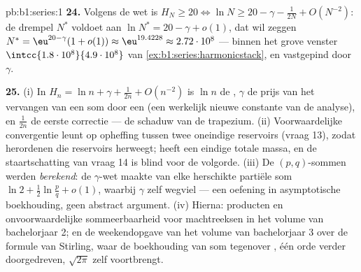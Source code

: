 \begin{solution}{pb:b1:series:1}
\textbf{24.} Volgens de wet is $H_N \geq 20 \iff \ln N \geq 20 -
\gamma - \frac{1}{2N} + O(N^{-2})$: de drempel $N^*$ voldoet aan
$\ln N^* = 20 - \gamma + o(1)$, dat wil zeggen $N^* = \eu^{20 -
\gamma}(1 + o(1)) \approx \eu^{19.4228} \approx 2.72\cdot10^{8}$
--- binnen het grove venster $\intcc{1.8\cdot10^8}{4.9\cdot10^8}$
van \cref{ex:b1:series:harmonicstack}, en vastgepind door
$\gamma$.

\textbf{25.} (i) In $H_n = \ln n + \gamma + \frac{1}{2n} +
O(n^{-2})$ is $\ln n$ de , $\gamma$ de prijs van het
vervangen van een som door een  (een werkelijk nieuwe
constante van de analyse), en $\frac{1}{2n}$ de eerste correctie
--- de schaduw van de trapezium. (ii) Voorwaardelijke
convergentie leunt op opheffing tussen twee oneindige reservoirs
(vraag 13), zodat herordenen die reservoirs herweegt;  heeft een eindige totale massa, en de staartschatting
van vraag 14 is blind voor de volgorde. (iii) De
$(p,q)$-sommen werden \emph{berekend}: de $\gamma$-wet maakte
van elke herschikte partiële som $\ln 2 + \frac12\ln\frac pq +
o(1)$, waarbij $\gamma$ zelf wegviel --- een oefening in
asymptotische boekhouding, geen abstract argument. (iv) Hierna:
producten en onvoorwaardelijke sommeerbaarheid voor machtreeksen
in het volume van bachelorjaar 2; en de weekendopgave van het
volume van bachelorjaar 3 over de formule van Stirling, waar de
boekhouding van som tegenover , één orde verder
doorgedreven, $\sqrt{2\pi}$ zelf voortbrengt.
\end{solution}
